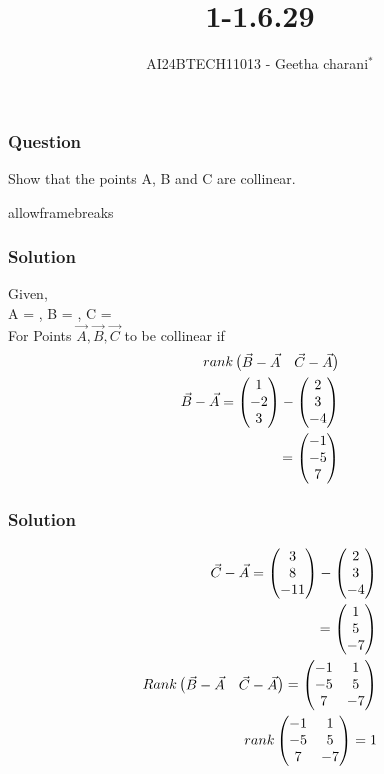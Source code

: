 \documentclass{beamer}
\begin{document}
\title{1-1.6.29}
\author{AI24BTECH11013 - Geetha charani$^{*}$}
\date{}
\frame{\titlepage}

\begin{frame}
\frametitle{Question}
Show that the points A, B and C are collinear.
\end{frame}
\begin{frame}{allowframebreaks}
\frametitle{Solution}
Given,\\
    A = , B = , C = \\ 
    For Points $\Vec{A}, \Vec{B}, \Vec{C}$ to be collinear if\\
    \begin{align}
        rank \begin{pmatrix}\Vec{B}-\Vec{A} & \Vec{C}-\Vec{A}\end{pmatrix}\\
        \Vec{B}-\Vec{A} = \begin{pmatrix}1 \\ -2 \\ 3\end{pmatrix} - \begin{pmatrix}2 \\ 3\\ -4\end{pmatrix}\\
        = \begin{pmatrix}-1 \\ -5 \\ 7\end{pmatrix}
    \end{align}
\end{frame}
\begin{frame}
\frametitle{Solution}
\begin{align}
        \Vec{C} - \Vec{A} = \begin{pmatrix}3 \\ 8 \\ -11\end{pmatrix} - \begin{pmatrix}2 \\ 3\\ -4\end{pmatrix}\\
        =\begin{pmatrix}1 \\ 5 \\ -7\end{pmatrix}\\
        Rank \begin{pmatrix}\Vec{B}-\Vec{A} & \Vec{C}-\Vec{A}\end{pmatrix} = \begin{pmatrix}-1 & 1 \\ -5 & 5 \\ 7 & -7\end{pmatrix}\\
         rank\begin{pmatrix}-1 & 1 \\ -5 & 5 \\ 7 & -7\end{pmatrix} = 1
    \end{align}
    \end{frame}
\end{document}
